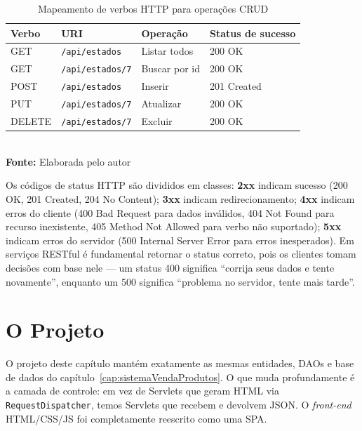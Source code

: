 \begin{table}[!htbp]
\centering
\caption{Mapeamento de verbos HTTP para operações CRUD}
\label{tab:cap10VerbosHTTP}
\begin{tabular}{llll}
    \hline
    \textbf{Verbo} & \textbf{URI}            & \textbf{Operação} & \textbf{Status de sucesso} \\ \hline
    GET            & \texttt{/api/estados}   & Listar todos      & 200 OK                     \\
    GET            & \texttt{/api/estados/7} & Buscar por id     & 200 OK                     \\
    POST           & \texttt{/api/estados}   & Inserir           & 201 Created                \\
    PUT            & \texttt{/api/estados/7} & Atualizar         & 200 OK                     \\
    DELETE         & \texttt{/api/estados/7} & Excluir           & 200 OK                     \\ \hline
\end{tabular}
\\\textbf{Fonte:} Elaborada pelo autor
\end{table}

\begin{saibaMais}
    Os códigos de status HTTP são divididos em classes: \textbf{2xx} indicam sucesso (200 OK, 201 Created, 204 No Content); \textbf{3xx} indicam redirecionamento; \textbf{4xx} indicam erros do cliente (400 Bad Request para dados inválidos, 404 Not Found para recurso inexistente, 405 Method Not Allowed para verbo não suportado); \textbf{5xx} indicam erros do servidor (500 Internal Server Error para erros inesperados). Em serviços RESTful é fundamental retornar o status correto, pois os clientes tomam decisões com base nele --- um status 400 significa ``corrija seus dados e tente novamente'', enquanto um 500 significa ``problema no servidor, tente mais tarde''.
\end{saibaMais}


\section{O Projeto}

O projeto deste capítulo mantém exatamente as mesmas entidades, DAOs e base de dados do capítulo~\ref{cap:sistemaVendaProdutos}. O que muda profundamente é a camada de controle: em vez de Servlets que geram HTML via \texttt{RequestDispatcher}, temos Servlets que recebem e devolvem JSON. O \textit{front-end} HTML/CSS/JS foi completamente reescrito como uma SPA.

